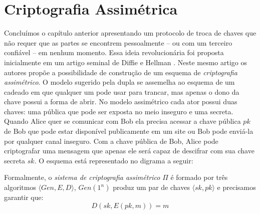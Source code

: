 \chapter{Criptografia Assimétrica}
\label{cha:criptografia-assimetrica}

Concluímos o capítulo anterior apresentando um protocolo de troca de chaves que não requer que as partes se encontrem pessoalmente -- ou com um terceiro confiável -- em nenhum momento.
Essa ideia revolucionária foi proposta inicialmente em um artigo seminal de Diffie e Hellman \cite{Diffie76}.
Neste mesmo artigo os autores propõe a possibilidade de construção de um esquema de {\em criptografia assimétrico}.
O modelo sugerido pela dupla se assemelha ao esquema de um cadeado em que qualquer um pode usar para trancar, mas apenas o dono da chave possui a forma de abrir.
No modelo assimétrico cada ator possui duas chaves: uma pública que pode ser exposta no meio inseguro e uma secreta.
Quando Alice quer se comunicar com Bob ela precisa acessar a chave pública $pk$ de Bob que pode estar disponível publicamente em um site ou Bob pode enviá-la por qualquer canal inseguro.
Com a chave pública de Bob, Alice pode criptografar uma mensagem que apenas ele será capaz de descifrar com sua chave secreta $sk$.
O esquema está representado no digrama a seguir:

\begin{center}
\end{center}

Formalmente, o {\em sistema de criptografia assimétrico} $\Pi$ é formado por três algoritmos $\langle Gen, E, D \rangle$, $Gen(1^n)$ produz um par de chaves $\langle sk, pk \rangle$ e precisamos garantir que:
\begin{displaymath}
  D(sk, E(pk, m)) = m
\end{displaymath}

